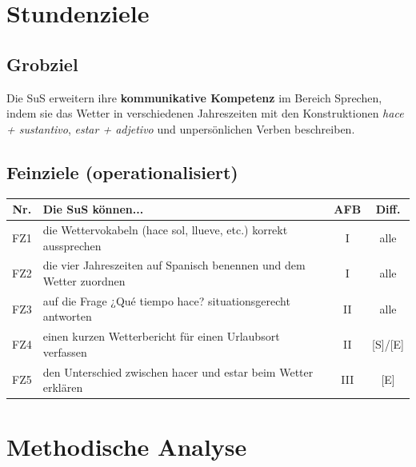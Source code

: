 \documentclass[11pt,a4paper]{article}
\begin{document}
\section{Stundenziele}

\subsection{Grobziel}
Die SuS erweitern ihre \textbf{kommunikative Kompetenz} im Bereich Sprechen, indem sie das Wetter in verschiedenen Jahreszeiten mit den Konstruktionen \textit{hace + sustantivo}, \textit{estar + adjetivo} und unpersönlichen Verben beschreiben.

\subsection{Feinziele (operationalisiert)}
\begin{tabular}{|c|p{8cm}|c|c|}
\hline
\textbf{Nr.} & \textbf{Die SuS können...} & \textbf{AFB} & \textbf{Diff.} \\
\hline
FZ1 & die Wettervokabeln (hace sol, llueve, etc.) korrekt aussprechen & I & alle \\
\hline
FZ2 & die vier Jahreszeiten auf Spanisch benennen und dem Wetter zuordnen & I & alle \\
\hline
FZ3 & auf die Frage ¿Qué tiempo hace? situationsgerecht antworten & II & alle \\
\hline
FZ4 & einen kurzen Wetterbericht für einen Urlaubsort verfassen & II & [S]/[E] \\
\hline
FZ5 & den Unterschied zwischen hacer und estar beim Wetter erklären & III & [E] \\
\hline
\end{tabular}

\section{Methodische Analyse}
\end{document}
